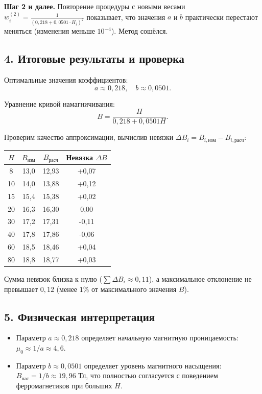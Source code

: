 \documentclass{article}
\begin{document}
\textbf{Шаг 2 и далее.} 
Повторение процедуры с новыми весами $w_i^{(2)} = \frac{1}{(0{,}218 + 0{,}0501 \cdot H_i)^2}$ показывает, что значения $a$ и $b$ практически перестают меняться (изменения меньше $10^{-4}$). Метод сошёлся.

\subsection*{4. Итоговые результаты и проверка}

Оптимальные значения коэффициентов:
\begin{equation}
\boxed{a \approx 0{,}218, \quad b \approx 0{,}0501.}
\end{equation}

Уравнение кривой намагничивания:
\begin{equation}
B = \frac{H}{0{,}218 + 0{,}0501H}.
\end{equation}

Проверим качество аппроксимации, вычислив невязки $\Delta B_i = B_{i,\text{изм}} - B_{i,\text{расч}}$:

\begin{center}
\begin{tabular}{|c|c|c|c|}
\hline
$H$ & $B_{\text{изм}}$ & $B_{\text{расч}}$ & Невязка $\Delta B$ \\
\hline
8 & 13,0 & 12,93 & +0,07 \\
10 & 14,0 & 13,88 & +0,12 \\
15 & 15,4 & 15,38 & +0,02 \\
20 & 16,3 & 16,30 & 0,00 \\
30 & 17,2 & 17,31 & -0,11 \\
40 & 17,8 & 17,86 & -0,06 \\
60 & 18,5 & 18,46 & +0,04 \\
80 & 18,8 & 18,77 & +0,03 \\
\hline
\end{tabular}
\end{center}

Сумма невязок близка к нулю ($\sum \Delta B_i \approx 0{,}11$), а максимальное отклонение не превышает $0{,}12$ (менее $1\%$ от максимального значения $B$).

\subsection*{5. Физическая интерпретация}
\begin{itemize}
    \item Параметр $a \approx 0{,}218$ определяет начальную магнитную проницаемость: $\mu_0 \approx 1/a \approx 4{,}6$.
    \item Параметр $b \approx 0{,}0501$ определяет уровень магнитного насыщения: $B_{\text{нас}} = 1/b \approx 19{,}96$ Тл, что полностью согласуется с поведением ферромагнетиков при больших $H$.
\end{itemize}
\end{document}

